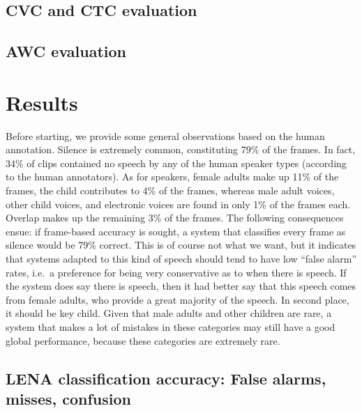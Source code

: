 \documentclass[english,floatsintext,man]{apa6}
\begin{document}
\subsection{CVC and CTC evaluation}\label{cvc-and-ctc-evaluation}

\subsection{AWC evaluation}\label{awc-evaluation}

\section{Results}\label{results}

Before starting, we provide some general observations based on the human
annotation. Silence is extremely common, constituting 79\% of the
frames. In fact, 34\% of clips contained no speech by any of the human
speaker types (according to the human annotators). As for speakers,
female adults make up 11\% of the frames, the child contributes to 4\%
of the frames, whereas male adult voices, other child voices, and
electronic voices are found in only 1\% of the frames each. Overlap
makes up the remaining 3\% of the frames. The following consequences
ensue: if frame-based accuracy is sought, a system that classifies every
frame as silence would be 79\% correct. This is of course not what we
want, but it indicates that systems adapted to this kind of speech
should tend to have low \enquote{false alarm} rates, i.e.~a preference
for being very conservative as to when there is speech. If the system
does say there is speech, then it had better say that this speech comes
from female adults, who provide a great majority of the speech. In
second place, it should be key child. Given that male adults and other
children are rare, a system that makes a lot of mistakes in these
categories may still have a good global performance, because these
categories are extremely rare.

\subsection{LENA classification accuracy: False alarms, misses,
confusion}\label{lena-classification-accuracy-false-alarms-misses-confusion}
\end{document}
